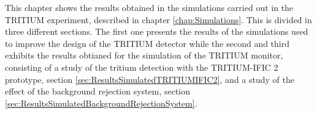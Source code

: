 This chapter shows the results obtained in the simulations carried out in the TRITIUM experiment, described in chapter \ref{chap:Simulations}. This is divided in three different sections. The first one presents the results of the simulations used to improve the design of the TRITIUM detector while the second and third exhibits the results obtianed for the simulation of the TRITIUM monitor, consisting of a study of the tritium detection with the TRITIUM-IFIC 2 prototype, section \ref{sec:ResultsSimulatedTRITIUMIFIC2}, and a study of the effect of the background rejection system, section \ref{sec:ResultsSimulatedBackgroundRejectionSystem}.